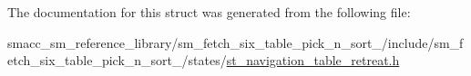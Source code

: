 The documentation for this struct was generated from the following file\+:\begin{DoxyCompactItemize}
\item 
smacc\+\_\+sm\+\_\+reference\+\_\+library/sm\+\_\+fetch\+\_\+six\+\_\+table\+\_\+pick\+\_\+n\+\_\+sort\+\_/include/sm\+\_\+fetch\+\_\+six\+\_\+table\+\_\+pick\+\_\+n\+\_\+sort\+\_/states/\hyperlink{st__navigation__table__retreat_8h}{st\+\_\+navigation\+\_\+table\+\_\+retreat.\+h}\end{DoxyCompactItemize}
